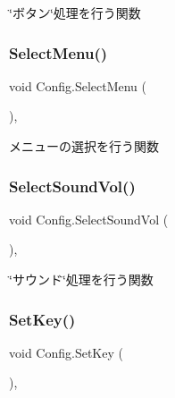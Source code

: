 \char`\"{}ボタン\char`\"{}処理を行う関数 

\mbox{\label{class_config_af831e43ea181c0244cf91ceaaddb112d}} 
\subsubsection{\texorpdfstring{Select\+Menu()}{SelectMenu()}}
{\footnotesize\ttfamily void Config.\+Select\+Menu (\begin{DoxyParamCaption}{ }\end{DoxyParamCaption})\hspace{0.3cm}{\ttfamily [inline]}, {\ttfamily [private]}}



メニューの選択を行う関数 

\mbox{\label{class_config_a046e51367235ce55f4de31f43022b9c6}} 
\subsubsection{\texorpdfstring{Select\+Sound\+Vol()}{SelectSoundVol()}}
{\footnotesize\ttfamily void Config.\+Select\+Sound\+Vol (\begin{DoxyParamCaption}{ }\end{DoxyParamCaption})\hspace{0.3cm}{\ttfamily [inline]}, {\ttfamily [private]}}



\char`\"{}サウンド\char`\"{}処理を行う関数 

\mbox{\label{class_config_acc37b6bfa98a26666611bae4fe005d2e}} 
\subsubsection{\texorpdfstring{Set\+Key()}{SetKey()}}
{\footnotesize\ttfamily void Config.\+Set\+Key (\begin{DoxyParamCaption}{ }\end{DoxyParamCaption})\hspace{0.3cm}{\ttfamily [inline]}, {\ttfamily [private]}}



